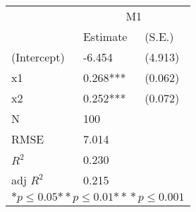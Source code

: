 \begin{tabular}{*{3}{l}}
\hline
                  & \multicolumn{2}{c}{M1}   \tabularnewline
                   &Estimate  &(S.E.)  \tabularnewline
 \hline
 \hline
   (Intercept)     &-6.454   &   (4.913) \tabularnewline
   x1              &0.268***   &   (0.062) \tabularnewline
   x2              &0.252***   &   (0.072) \tabularnewline
 \hline
 N                 &100       &        \tabularnewline
 RMSE             &7.014         & \tabularnewline
 $R^2$             &0.230         & \tabularnewline
 adj $R^2$         &0.215         & \tabularnewline
 \hline
\hline
 
 \multicolumn{3}{c}{${*  p}\le 0.05$${*\!\!*  p}\le 0.01$${*\!\!*\!\!*  p}\le 0.001$}\tabularnewline
 \end{tabular}